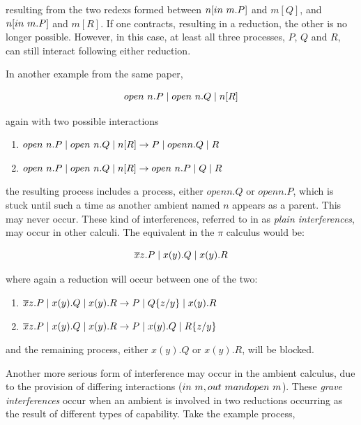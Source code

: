 \noindent resulting from the two redexs formed between
$n[in\ m.P]$ and $m[Q]$, and $n[in\ m.P]$ and $m[R]$.  If one
contracts, resulting in a reduction, the other is no longer possible.
However, in this case, at least all three processes, $P$, $Q$ and $R$,
can still interact following either reduction.

In another example from the same paper,

\begin{equation}
open\ n.P \;|\; open\ n.Q \;|\; n[R]
\end{equation}

\noindent again with two possible interactions

\begin{enumerate}
\item $open\ n.P \;|\; open\ n.Q \;|\; n[R] \rightarrow P \;|\; open
  n.Q \;|\; R$
\item $open\ n.P \;|\; open\ n.Q \;|\; n[R] \rightarrow
  open\ n.P \;|\; Q \;|\; R$
\end{enumerate}


\noindent the resulting process includes a process, either $open n.Q$
or $open n.P$, which is stuck until such a time as another ambient
named $n$ appears as a parent.  This may never occur.  These kind of
interferences, referred to in \cite{sangiorgi:mobsafeambients} as
\emph{plain interferences}, may occur in other calculi.  The equivalent
in the $\pi$ calculus would be:

\begin{equation}
\overline{x}z.P \;|\; x(y).Q \;|\; x(y).R
\end{equation}

\noindent where again a reduction will occur between one of the two:

\begin{enumerate}
\item $\overline{x}z.P \;|\; x(y).Q \;|\; x(y).R \rightarrow P \;|\; Q\{z/y\}
  \;|\; x(y).R$
\item $\overline{x}z.P \;|\; x(y).Q \;|\; x(y).R \rightarrow P \;|\; x(y).Q
  \;|\; R\{z/y\}$
\end{enumerate}

\noindent and the remaining process, either $x(y).Q$ or $x(y).R$, will
be blocked.

Another more serious form of interference may occur in the ambient
calculus, due to the provision of differing interactions ($in\ m,
out\ m and open\ m$).  These \emph{grave interferences} occur
when an ambient is involved in two reductions occurring as the result
of different types of capability.  Take the example process,

